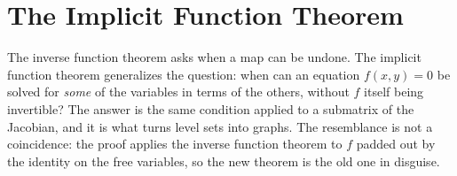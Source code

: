 \chapter{The Implicit Function Theorem}
\label{ch:implicit_function_theorem}

The inverse function theorem asks when a map can be undone. The implicit function theorem
generalizes the question: when can an equation $f(x,y) = 0$ be solved for \emph{some} of the
variables in terms of the others, without $f$ itself being invertible? The answer is the same
condition applied to a submatrix of the Jacobian, and it is what turns level sets into graphs.
The resemblance is not a coincidence: the proof applies the inverse function theorem to $f$
padded out by the identity on the free variables, so the new theorem is the old one in disguise.



